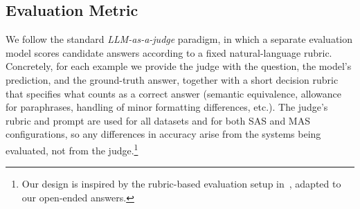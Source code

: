 \documentclass{article} %
\begin{document}
\subsection{Evaluation Metric}
\label{sec:metric}

We follow the standard \emph{LLM-as-a-judge} paradigm, in which a separate evaluation model scores candidate answers according to a fixed natural-language rubric. Concretely, for each example we provide the judge with the question, the model's prediction, and the ground-truth answer, together with a short decision rubric that specifies what counts as a correct answer (semantic equivalence, allowance for paraphrases, handling of minor formatting differences, etc.). The judge's rubric and prompt are used for all datasets and for both SAS and MAS configurations, so any differences in accuracy arise from the systems being evaluated, not from the judge.\footnote{Our design is inspired by the rubric-based evaluation setup in~\citet{krishna2025fact}, adapted to our open-ended answers.}
\end{document}
